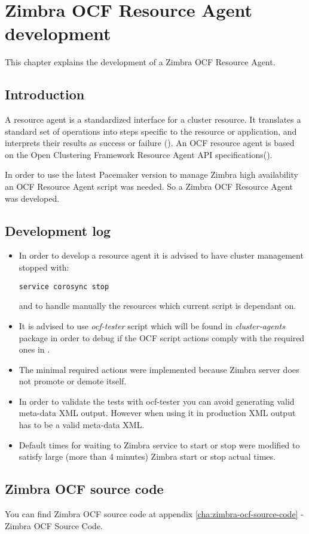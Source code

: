 

\chapter{Zimbra OCF Resource Agent development}
\label{chap:zimbra-ocf}
This chapter explains the development of a Zimbra OCF Resource Agent.

\section {Introduction}
A resource agent is a standardized interface for a cluster resource. It translates a standard set of operations into steps specific to the resource or application, and interprets their results as success or failure (\cite{ResourceAgentsWiki}). An OCF resource agent is based on the Open Clustering Framework Resource Agent API specifications(\cite{OCFResourceAgentsWiki}).

In order to use the latest Pacemaker version to manage Zimbra high availability an OCF Resource Agent script was needed. So a Zimbra OCF Resource Agent was developed.

\section {Development log}
\begin{itemize}
  \item {In order to develop a resource agent it is advised to have cluster management stopped with:
\begin{verbatim}
service corosync stop
\end{verbatim}
and to handle manually the resources which current script is dependant on.
  }
  \item {It is advised to use \textit{ocf-tester} script which will be found in \textit{cluster-agents} package in order to debug if the OCF script actions comply with the required ones in \cite{OCFResourceAgentsWiki}.
  }
  \item {The minimal required actions were implemented because Zimbra server does not promote or demote itself.
  }
  \item {In order to validate the tests with ocf-tester you can avoid generating valid meta-data XML output. However when using it in production XML output has to be a valid meta-data XML. 
  }
  \item {Default times for waiting to Zimbra service to start or stop were modified to satisfy large (more than 4 minutes) Zimbra start or stop actual times.
  }
\end{itemize}

\section {Zimbra OCF source code}

You can find Zimbra OCF source code at appendix {\ref{cha:zimbra-ocf-source-code} - Zimbra OCF Source Code}.



